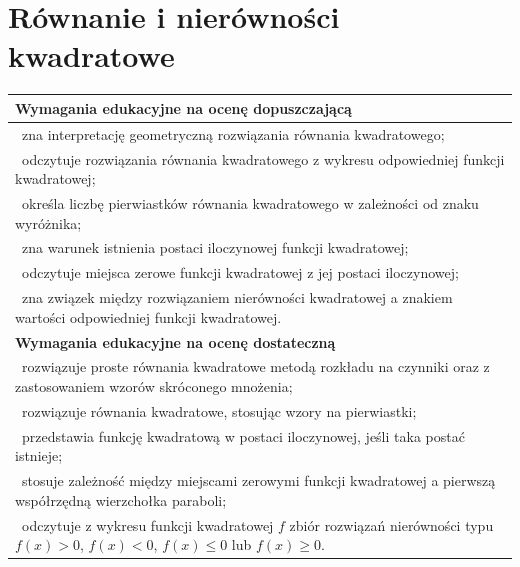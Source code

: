 \documentclass[12pt,a4paper]{article}
\begin{document}
	\section{Równanie i nierówności kwadratowe}
	
	\begin{longtable}{|p{16cm}|}
		\hline
		
		\textbf{Wymagania edukacyjne na ocenę dopuszczającą} \\ \hline
		
		\textbullet\ zna interpretację geometryczną rozwiązania równania kwadratowego; \\
		
		\textbullet\ odczytuje rozwiązania równania kwadratowego z wykresu odpowiedniej funkcji kwadratowej; \\
		
		\textbullet\ określa liczbę pierwiastków równania kwadratowego w zależności od znaku wyróżnika; \\
		
		\textbullet\ zna warunek istnienia postaci iloczynowej funkcji kwadratowej; \\
		
		\textbullet\ odczytuje miejsca zerowe funkcji kwadratowej z jej postaci iloczynowej; \\
		
		\textbullet\ zna związek między rozwiązaniem nierówności kwadratowej a znakiem wartości odpowiedniej funkcji kwadratowej. \\ \hline
		
		\textbf{Wymagania edukacyjne na ocenę dostateczną} \\ \hline
		
		\textbullet\ rozwiązuje proste równania kwadratowe metodą rozkładu na czynniki oraz z zastosowaniem wzorów skróconego mnożenia; \\
		
		\textbullet\ rozwiązuje równania kwadratowe, stosując wzory na pierwiastki; \\
		
		\textbullet\ przedstawia funkcję kwadratową w postaci iloczynowej, jeśli taka postać istnieje; \\
		
		\textbullet\ stosuje zależność między miejscami zerowymi funkcji kwadratowej a pierwszą współrzędną wierzchołka paraboli; \\
		
		\textbullet\ odczytuje z wykresu funkcji kwadratowej $f$ zbiór rozwiązań nierówności typu $f(x)>0$, $f(x)<0$, $f(x)\leq 0$ lub $f(x)\geq 0$. \\ \hline
		

\end{longtable}
\end{document}
